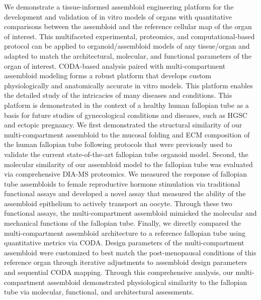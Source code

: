 \begin{refsection}
    We demonstrate a tissue-informed assembloid engineering platform for the development and validation of in vitro models of organs with quantitative comparisons between the assembloid and the reference cellular map of the organ of interest. This multifaceted experimental, proteomics, and computational-based protocol can be applied to organoid/assembloid models of any tissue/organ and adapted to match the architectural, molecular, and functional parameters of the organ of interest. CODA-based analysis paired with multi-compartment assembloid modeling forms a robust platform that develops custom physiologically and anatomically accurate in vitro models. This platform enables the detailed study of the intricacies of many diseases and conditions. 
    This platform is demonstrated in the context of a healthy human fallopian tube as a basis for future studies of  gynecological conditions and diseases, such as HGSC and ectopic pregnancy\cite{shao2010a,chua2017a,labidi-galy2017a,jones2013a,kim2018a,ducie2017a}. We first demonstrated the structural similarity of our multi-compartment assembloid to the mucosal folding and ECM composition of the human fallopian tube following protocols that were previously used to validate the current state-of-the-art fallopian tube organoid model\cite{kessler2015a,xie2018a}. Second, the molecular similarity of our assembloid model to the fallopian tube was evaluated via comprehensive DIA-MS proteomics\cite{gillet2012a,collins2017a,bons2023a,meier2020a}. We measured the response of fallopian tube assembloids to female reproductive hormone stimulation via traditional functional assays\cite{kessler2015a,xie2018a,barton2020a} and developed a novel assay that measured the ability of the assembloid epithelium to actively transport an oocyte\cite{croxatto2002a,leese2001a,yuan2021a,suarez2021a,wanggren2008a}. Through these two functional assays, the multi-compartment assembloid mimicked the molecular and mechanical functions of the fallopian tube. Finally, we directly compared the multi-compartment assembloid architecture to a reference fallopian tube using quantitative metrics via CODA\cite{kiemen2022a}. Design parameters of the multi-compartment assembloid were customized to best match the post-menopausal conditions of this reference organ through iterative adjustments to assembloid design parameters and sequential CODA mapping. Through this comprehensive analysis, our multi-compartment assembloid demonstrated physiological similarity to the fallopian tube via molecular, functional, and architectural assessments.

\end{refsection}

